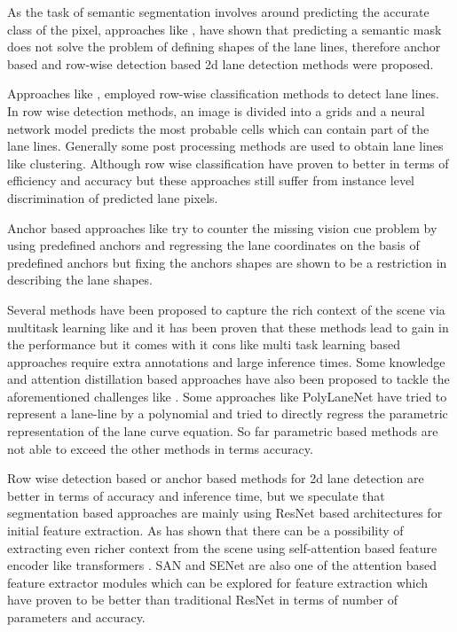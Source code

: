        As the task of semantic segmentation involves around predicting the accurate class of the pixel, approaches like \cite{https://doi.org/10.48550/arxiv.2010.12035}, \cite{inbook} have shown that predicting a semantic mask does not solve the problem of defining shapes of the lane lines, therefore anchor based and row-wise detection based 2d lane detection methods were proposed.

 Approaches like \cite{DBLP:journals/corr/abs-2005-08630}, \cite{DBLP:journals/corr/abs-2004-11757} employed row-wise classification methods to detect lane lines. In row wise detection methods, an image is divided into a grids and a neural network model predicts the most probable cells which can contain part of the lane lines. Generally some post processing methods are used to obtain lane lines like clustering. Although row wise classification have proven to better in terms of efficiency and accuracy but these approaches still suffer from instance level discrimination of predicted lane pixels.
 
 Anchor based approaches like  \cite{https://doi.org/10.48550/arxiv.2010.12035} try to counter the missing vision cue problem by using predefined anchors and regressing the lane coordinates on the basis of predefined anchors but fixing the anchors shapes are shown to be a restriction in describing the lane shapes.

Several methods have been proposed to capture the rich context of the scene via multitask learning like \cite{inbook} and it has been proven that these methods lead to gain in the performance but it comes with it cons like multi task learning based approaches require extra annotations and large inference times. Some knowledge and attention distillation based approaches have also been proposed to tackle the aforementioned challenges like \cite{DBLP:journals/corr/abs-1908-00821}. Some approaches like PolyLaneNet\cite{DBLP:journals/corr/abs-2004-10924} have tried  to represent a lane-line by a polynomial and tried to directly regress the parametric representation of the lane curve equation. So far parametric based methods are not able to exceed the other methods in terms accuracy.

Row wise detection based or anchor based methods for 2d lane detection are better in terms of accuracy and inference time, but we speculate that segmentation based approaches are mainly using ResNet\cite{DBLP:journals/corr/HeZRS15} based architectures for initial feature extraction. As \cite{DBLP:journals/corr/abs-2105-05003} has shown that there can be a possibility of extracting even richer context from the scene using self-attention based feature encoder like transformers \cite{https://doi.org/10.48550/arxiv.1706.03762}.   SAN\cite{DBLP:journals/corr/abs-2004-13621} and SENet\cite{DBLP:journals/corr/abs-1709-01507} are also one of the attention based feature extractor modules which can be explored for feature extraction which have proven to be better than traditional ResNet\cite{DBLP:journals/corr/HeZRS15} in terms of number of parameters and accuracy. 

